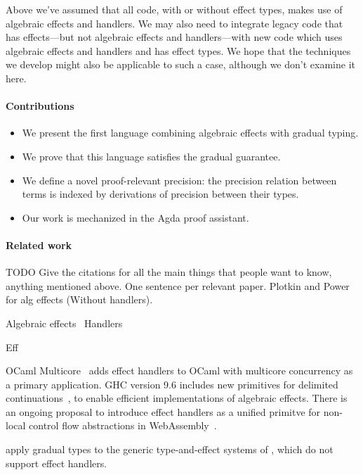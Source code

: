 Above we've assumed that all code, with or without effect types,
makes use of algebraic effects and handlers.
We may also need to integrate legacy code that has effects---but
not algebraic effects and handlers---with new code which uses algebraic effects
and handlers and has effect types.
We hope that the techniques we develop might also be applicable to such a case,
although we don't examine it here.

\paragraph{Contributions}

\begin{itemize}
  \item We present the first language combining algebraic effects with gradual typing.
  \item We prove that this language satisfies the gradual guarantee.
  \item We define a novel proof-relevant precision: the precision relation
    between terms is indexed by derivations of precision between their types.
  \item Our work is mechanized in the Agda proof assistant.
\end{itemize}

\paragraph{Related work}

TODO Give the citations for all the main things that people want to know, anything mentioned above.
One sentence per relevant paper. Plotkin and Power for alg effects (Without handlers).

Algebraic effects~\citep{plotkin-power-2001}
Handlers~\citep{plotkin-pretnar-2009}

Eff~\citep{bauer-pretnar-2014}

OCaml Multicore~\citep{dolan-2015} adds effect handlers to OCaml with
multicore concurrency as a primary application.
GHC version 9.6 includes new primitives for delimited continuations~\citep{ghc-delcont},
to enable efficient implementations of algebraic effects.
There is an ongoing proposal to introduce effect handlers as a unified primitve
for non-local control flow abstractions in WebAssembly~\citep{wasmfx}.

\citet{schwerter-2016} apply gradual types to the generic type-and-effect systems of \citet{marino-2009},
which do not support effect handlers.

